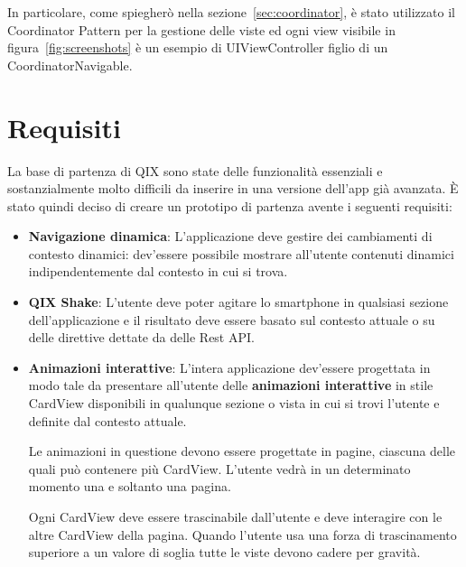 In particolare, come spiegherò nella sezione~\ref{sec:coordinator}, è stato utilizzato il Coordinator Pattern
per la gestione delle viste ed ogni view visibile in figura~\ref{fig:screenshots} è un esempio di UIViewController
figlio di un CoordinatorNavigable.

\section{Requisiti}
La base di partenza di QIX sono state delle funzionalità essenziali e 
sostanzialmente molto difficili da inserire in una versione dell'app già avanzata.
È stato quindi deciso di creare un prototipo di partenza avente i seguenti requisiti:

\begin{itemize}
    \item {
        \textbf{Navigazione dinamica}: L'applicazione deve gestire dei cambiamenti di contesto
        dinamici: dev'essere possibile mostrare all'utente contenuti dinamici indipendentemente
        dal contesto in cui si trova. 
    }
    \item {
        \textbf{QIX Shake}: L'utente deve poter agitare lo smartphone in qualsiasi
        sezione dell'applicazione e il risultato deve essere basato sul contesto attuale o su delle direttive dettate
        da delle Rest API.
    } 
    \item {
        \textbf{Animazioni interattive}: L'intera applicazione dev'essere progettata in modo tale da presentare all'utente
        delle \textbf{animazioni interattive} in stile CardView\cite{cardview} disponibili in 
        qualunque sezione o vista in cui si trovi l'utente e definite dal contesto attuale.

        Le animazioni in questione devono essere progettate in pagine, ciascuna delle quali può contenere 
        più CardView. L'utente vedrà in un determinato momento una e soltanto una pagina.

        Ogni CardView deve essere trascinabile dall'utente e deve interagire con le altre CardView della pagina. 
        Quando l'utente usa una forza di trascinamento superiore a un valore di soglia tutte le viste devono
        cadere per gravità.
        
}
\end{itemize}
